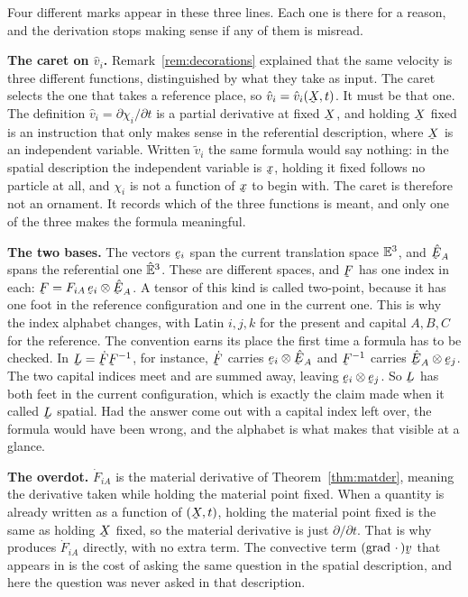 \begin{remark}\label{rem:hatinch4}
Four different marks appear in these three lines. Each one is there for a
reason, and the derivation stops making sense if any of them is misread.

\textbf{The caret on $\hat v_{i}$.} Remark~\ref{rem:decorations} explained
that the same velocity is three different functions, distinguished by what
they take as input. The caret selects the one that takes a reference
place, so $\hat v_{i}=\hat v_{i}(\bX,t)$. It must be that one. The
definition $\hat v_{i}=\partial\chi_{i}/\partial t$ is a partial
derivative at fixed $\bX$, and holding $\bX$ fixed is an instruction that
only makes sense in the referential description, where $\bX$ is an
independent variable. Written $\tilde v_{i}$ the same formula would say
nothing: in the spatial description the independent variable is $\bx$,
holding it fixed follows no particle at all, and $\chi_{i}$ is not a
function of $\bx$ to begin with. The caret is therefore not an ornament.
It records which of the three functions is meant, and only one of the
three makes the formula meaningful.

\textbf{The two bases.} The vectors $\be_{i}$ span the current translation
space $\mathbb{E}^{3}$, and $\hbE_{A}$ spans the referential one $\hat{\mathbb{E}}^{3}$. These are
different spaces, and $\bF$ has one index in each:
$\bF=F_{iA}\,\be_{i}\otimes\hbE_{A}$. A tensor of this kind is called
two-point, because it has one foot in the reference configuration and one
in the current one. This is why the index alphabet changes, with Latin
$i,j,k$ for the present and capital $A,B,C$ for the reference. The
convention earns its place the first time a formula has to be checked. In
$\bL=\dot\bF\bF^{-1}$, for instance, $\dot\bF$ carries $\be_{i}\otimes
\hbE_{A}$ and $\bF^{-1}$ carries $\hbE_{A}\otimes\be_{j}$. The two capital
indices meet and are summed away, leaving $\be_{i}\otimes\be_{j}$. So $\bL$
has both feet in the current configuration, which is exactly the claim
 made when it called $\bL$ spatial. Had the answer come out with
a capital index left over, the formula would have been wrong, and the
alphabet is what makes that visible at a glance.

\textbf{The overdot.} $\dot F_{iA}$ is the material derivative of
Theorem~\ref{thm:matder}, meaning the derivative taken while holding the
material point fixed. When a quantity is already written as a function of
$(\bX,t)$, holding the material point fixed is the same as holding $\bX$
fixed, so the material derivative is just $\partial/\partial t$. That is
why  produces $\dot F_{iA}$ directly, with no extra term. The
convective term $(\grad\,\cdot\,)\bv$ that appears in  is the
cost of asking the same question in the spatial description, and here the
question was never asked in that description.


\end{remark}
